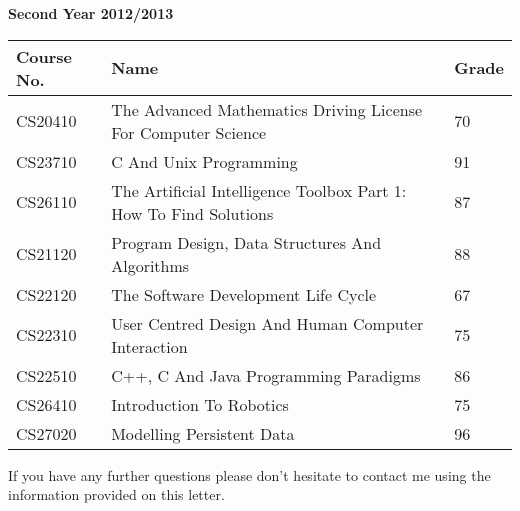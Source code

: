 \documentclass[11pt,a4paper,sans]{moderncv}        %
\begin{document}
\clearpage
\textbf{Second Year 2012/2013}
\begin{center}
    \begin{tabular}{| l | l | l |}
    \hline
    Course No. & Name & Grade \\ \hline
CS20410 & The Advanced Mathematics Driving License For Computer Science & 70 \\ \hline
CS23710 & C And Unix Programming & 91 \\ \hline
CS26110 &The Artificial Intelligence Toolbox Part 1: How To Find Solutions & 87 \\ \hline
CS21120 & Program Design, Data Structures And Algorithms & 88 \\ \hline
CS22120 &The Software Development Life Cycle	 & 67 \\ \hline
CS22310 & User Centred Design And Human Computer Interaction	 & 75 \\ \hline
CS22510 & C++, C And Java Programming Paradigms & 86 \\ \hline
CS26410 & Introduction To Robotics & 75 \\ \hline
CS27020 & Modelling Persistent Data & 96 \\ \hline
    \end{tabular}
\end{center}

If you have any further questions please don't hesitate to contact me using the information provided on this letter.

\makeletterclosing
\end{document}
